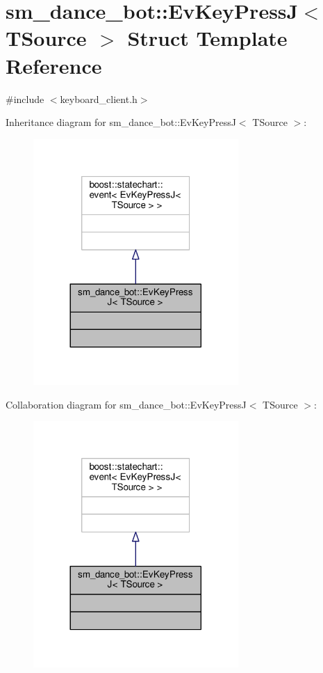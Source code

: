 \hypertarget{structsm__dance__bot_1_1EvKeyPressJ}{}\section{sm\+\_\+dance\+\_\+bot\+:\+:Ev\+Key\+PressJ$<$ T\+Source $>$ Struct Template Reference}
\label{structsm__dance__bot_1_1EvKeyPressJ}


{\ttfamily \#include $<$keyboard\+\_\+client.\+h$>$}



Inheritance diagram for sm\+\_\+dance\+\_\+bot\+:\+:Ev\+Key\+PressJ$<$ T\+Source $>$\+:
\nopagebreak
\begin{figure}[H]
\begin{center}
\leavevmode
\includegraphics[width=221pt]{structsm__dance__bot_1_1EvKeyPressJ__inherit__graph}
\end{center}
\end{figure}


Collaboration diagram for sm\+\_\+dance\+\_\+bot\+:\+:Ev\+Key\+PressJ$<$ T\+Source $>$\+:
\nopagebreak
\begin{figure}[H]
\begin{center}
\leavevmode
\includegraphics[width=221pt]{structsm__dance__bot_1_1EvKeyPressJ__coll__graph}
\end{center}
\end{figure}


